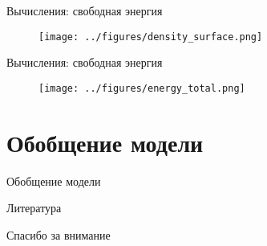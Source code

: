 \documentclass[aspectratio=169]{beamer}
\begin{document}
\begin{frame}{Вычисления: свободная энергия}
\vspace{-0.8cm}
\begin{figure}
	\texttt{[image: ../figures/density\_surface.png]}
\end{figure}
\end{frame}


\begin{frame}{Вычисления: свободная энергия}
\vspace{-0.8cm}
\begin{figure}
	\texttt{[image: ../figures/energy\_total.png]}
\end{figure}
\end{frame}


\section{Обобщение модели}

\begin{frame}{Обобщение модели}

\end{frame}


\begin{frame}{Литература}
\printbibliography
\end{frame}


\begin{frame}{}
\begin{center}
	\Large
	Спасибо за внимание
\end{center}
\end{frame}
\end{document}
